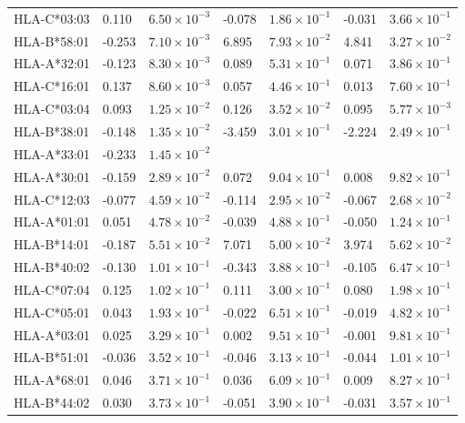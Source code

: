 \documentclass[]{article}
\begin{document}
\begin{longtable}[H]{lp{1cm}p{2cm}p{1cm}p{2cm}p{1cm}p{2cm}}
		HLA-C*03:03 & 0.110 & $6.50 \times 10^{-3}$ & -0.078 & $1.86 \times 10^{-1}$ & -0.031 & $3.66 \times 10^{-1}$ \\ 
		HLA-B*58:01 & -0.253 & $7.10 \times 10^{-3}$ & 6.895 & $7.93 \times 10^{-2}$ & 4.841 & $3.27 \times 10^{-2}$ \\ 
		HLA-A*32:01 & -0.123 & $8.30 \times 10^{-3}$ & 0.089 & $5.31 \times 10^{-1}$ & 0.071 & $3.86 \times 10^{-1}$ \\ 
		HLA-C*16:01 & 0.137 & $8.60 \times 10^{-3}$ & 0.057 & $4.46 \times 10^{-1}$ & 0.013 & $7.60 \times 10^{-1}$ \\ 
		HLA-C*03:04 & 0.093 & $1.25 \times 10^{-2}$ & 0.126 & $3.52 \times 10^{-2}$ & 0.095 & $5.77 \times 10^{-3}$ \\ 
		HLA-B*38:01 & -0.148 & $1.35 \times 10^{-2}$ & -3.459 & $3.01 \times 10^{-1}$ & -2.224 & $2.49 \times 10^{-1}$ \\ 
		HLA-A*33:01 & -0.233 & $1.45 \times 10^{-2}$ &  &  &  &  \\ 
		HLA-A*30:01 & -0.159 & $2.89 \times 10^{-2}$ & 0.072 & $9.04 \times 10^{-1}$ & 0.008 & $9.82 \times 10^{-1}$ \\ 
		HLA-C*12:03 & -0.077 & $4.59 \times 10^{-2}$ & -0.114 & $2.95 \times 10^{-2}$ & -0.067 & $2.68 \times 10^{-2}$ \\ 
		HLA-A*01:01 & 0.051 & $4.78 \times 10^{-2}$ & -0.039 & $4.88 \times 10^{-1}$ & -0.050 & $1.24 \times 10^{-1}$ \\ 
		HLA-B*14:01 & -0.187 & $5.51 \times 10^{-2}$ & 7.071 & $5.00 \times 10^{-2}$ & 3.974 & $5.62 \times 10^{-2}$ \\ 
		HLA-B*40:02 & -0.130 & $1.01 \times 10^{-1}$ & -0.343 & $3.88 \times 10^{-1}$ & -0.105 & $6.47 \times 10^{-1}$ \\ 
		HLA-C*07:04 & 0.125 & $1.02 \times 10^{-1}$ & 0.111 & $3.00 \times 10^{-1}$ & 0.080 & $1.98 \times 10^{-1}$ \\ 
		HLA-C*05:01 & 0.043 & $1.93 \times 10^{-1}$ & -0.022 & $6.51 \times 10^{-1}$ & -0.019 & $4.82 \times 10^{-1}$ \\ 
		HLA-A*03:01 & 0.025 & $3.29 \times 10^{-1}$ & 0.002 & $9.51 \times 10^{-1}$ & -0.001 & $9.81 \times 10^{-1}$ \\ 
		HLA-B*51:01 & -0.036 & $3.52 \times 10^{-1}$ & -0.046 & $3.13 \times 10^{-1}$ & -0.044 & $1.01 \times 10^{-1}$ \\ 
		HLA-A*68:01 & 0.046 & $3.71 \times 10^{-1}$ & 0.036 & $6.09 \times 10^{-1}$ & 0.009 & $8.27 \times 10^{-1}$ \\ 
		HLA-B*44:02 & 0.030 & $3.73 \times 10^{-1}$ & -0.051 & $3.90 \times 10^{-1}$ & -0.031 & $3.57 \times 10^{-1}$ \\ 

\end{longtable}
\end{document}
